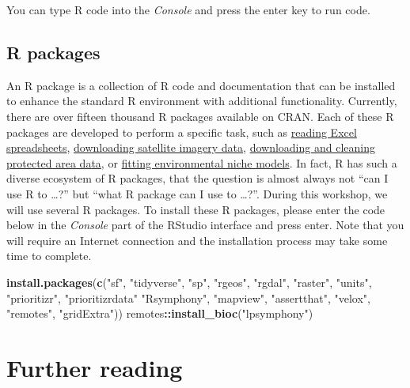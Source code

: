 \documentclass[12pt,]{book}
\newenvironment{Shaded}{\begin{snugshade}}{\end{snugshade}}
\newcommand{\KeywordTok}[1]{\textcolor[rgb]{0.13,0.29,0.53}{\textbf{#1}}}
\newcommand{\StringTok}[1]{\textcolor[rgb]{0.31,0.60,0.02}{#1}}
\newcommand{\OperatorTok}[1]{\textcolor[rgb]{0.81,0.36,0.00}{\textbf{#1}}}
\newcommand{\NormalTok}[1]{#1}
\begin{document}
You can type R code into the \emph{Console} and press the enter key to
run code.

\subsection{R packages}\label{r-packages}

An R package is a collection of R code and documentation that can be
installed to enhance the standard R environment with additional
functionality. Currently, there are over fifteen thousand R packages
available on CRAN. Each of these R packages are developed to perform a
specific task, such as
\href{https://cran.r-project.org/web/packages/readxl/index.html}{reading
Excel spreadsheets},
\href{https://cran.r-project.org/web/packages/MODIStsp/index.html}{downloading
satellite imagery data},
\href{https://cran.r-project.org/web/packages/wdpar/index.html}{downloading
and cleaning protected area data}, or
\href{https://cran.r-project.org/web/packages/ENMeval/index.html}{fitting
environmental niche models}. In fact, R has such a diverse ecosystem of
R packages, that the question is almost always not ``can I use R to
\ldots{}?'' but ``what R package can I use to \ldots{}?''. During this
workshop, we will use several R packages. To install these R packages,
please enter the code below in the \emph{Console} part of the RStudio
interface and press enter. Note that you will require an Internet
connection and the installation process may take some time to complete.

\begin{Shaded}
\begin{Highlighting}[]
\KeywordTok{install.packages}\NormalTok{(}\KeywordTok{c}\NormalTok{(}\StringTok{"sf"}\NormalTok{, }\StringTok{"tidyverse"}\NormalTok{, }\StringTok{"sp"}\NormalTok{, }\StringTok{"rgeos"}\NormalTok{, }\StringTok{"rgdal"}\NormalTok{, }\StringTok{"raster"}\NormalTok{,}
                   \StringTok{"units"}\NormalTok{, }\StringTok{"prioritizr"}\NormalTok{, }\StringTok{"prioritizrdata"} \StringTok{"Rsymphony"}\NormalTok{,}
                   \StringTok{"mapview"}\NormalTok{, }\StringTok{"assertthat"}\NormalTok{, }\StringTok{"velox"}\NormalTok{, }\StringTok{"remotes"}\NormalTok{,}
                   \StringTok{"gridExtra"}\NormalTok{))}
\NormalTok{remotes}\OperatorTok{::}\KeywordTok{install_bioc}\NormalTok{(}\StringTok{"lpsymphony"}\NormalTok{)}
\end{Highlighting}
\end{Shaded}

\section{Further reading}\label{further-reading}
\end{document}
